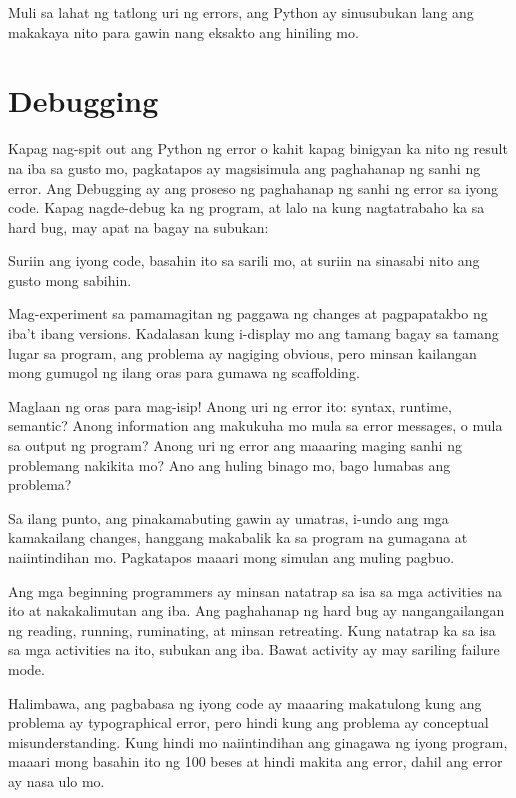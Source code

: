 \documentclass[10pt,]{book}
\providecommand{\tightlist}{%
  \setlength{\itemsep}{0pt}\setlength{\parskip}{0pt}}
\begin{document}
Muli sa lahat ng tatlong uri ng errors, ang Python ay sinusubukan lang
ang makakaya nito para gawin nang eksakto ang hiniling mo.

\section{Debugging}\label{debugging}


Kapag nag-spit out ang Python ng error o kahit kapag binigyan ka nito ng
result na iba sa gusto mo, pagkatapos ay magsisimula ang paghahanap ng
sanhi ng error. Ang Debugging ay ang proseso ng paghahanap ng sanhi ng
error sa iyong code. Kapag nagde-debug ka ng program, at lalo na kung
nagtatrabaho ka sa hard bug, may apat na bagay na subukan:

\begin{description}
\tightlist
\item[reading]
Suriin ang iyong code, basahin ito sa sarili mo, at suriin na sinasabi
nito ang gusto mong sabihin.
\item[running]
Mag-experiment sa pamamagitan ng paggawa ng changes at pagpapatakbo ng
iba't ibang versions. Kadalasan kung i-display mo ang tamang bagay sa
tamang lugar sa program, ang problema ay nagiging obvious, pero minsan
kailangan mong gumugol ng ilang oras para gumawa ng scaffolding.
\item[ruminating]
Maglaan ng oras para mag-isip! Anong uri ng error ito: syntax, runtime,
semantic? Anong information ang makukuha mo mula sa error messages, o
mula sa output ng program? Anong uri ng error ang maaaring maging sanhi
ng problemang nakikita mo? Ano ang huling binago mo, bago lumabas ang
problema?
\item[retreating]
Sa ilang punto, ang pinakamabuting gawin ay umatras, i-undo ang mga
kamakailang changes, hanggang makabalik ka sa program na gumagana at
naiintindihan mo. Pagkatapos maaari mong simulan ang muling pagbuo.
\end{description}

Ang mga beginning programmers ay minsan natatrap sa isa sa mga
activities na ito at nakakalimutan ang iba. Ang paghahanap ng hard bug
ay nangangailangan ng reading, running, ruminating, at minsan
retreating. Kung natatrap ka sa isa sa mga activities na ito, subukan
ang iba. Bawat activity ay may sariling failure mode.


Halimbawa, ang pagbabasa ng iyong code ay maaaring makatulong kung ang
problema ay typographical error, pero hindi kung ang problema ay
conceptual misunderstanding. Kung hindi mo naiintindihan ang ginagawa ng
iyong program, maaari mong basahin ito ng 100 beses at hindi makita ang
error, dahil ang error ay nasa ulo mo.
\end{document}
